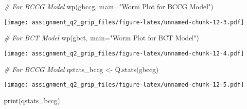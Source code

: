 \documentclass[
]{article}
\newenvironment{Shaded}{\begin{snugshade}}{\end{snugshade}}
\newcommand{\AttributeTok}[1]{\textcolor[rgb]{0.77,0.63,0.00}{#1}}
\newcommand{\CommentTok}[1]{\textcolor[rgb]{0.56,0.35,0.01}{\textit{#1}}}
\newcommand{\FunctionTok}[1]{\textcolor[rgb]{0.00,0.00,0.00}{#1}}
\newcommand{\NormalTok}[1]{#1}
\newcommand{\OtherTok}[1]{\textcolor[rgb]{0.56,0.35,0.01}{#1}}
\newcommand{\StringTok}[1]{\textcolor[rgb]{0.31,0.60,0.02}{#1}}
\begin{document}
\begin{Shaded}
\begin{Highlighting}[]
\CommentTok{\# For BCCG Model}
\FunctionTok{wp}\NormalTok{(gbccg, }\AttributeTok{main=}\StringTok{"Worm Plot for BCCG Model"}\NormalTok{)}
\end{Highlighting}
\end{Shaded}

\texttt{[image: assignment\_q2\_grip\_files/figure-latex/unnamed-chunk-12-3.pdf]}

\begin{Shaded}
\begin{Highlighting}[]
\CommentTok{\# For BCT Model}
\FunctionTok{wp}\NormalTok{(gbct, }\AttributeTok{main=}\StringTok{"Worm Plot for BCT Model"}\NormalTok{)}
\end{Highlighting}
\end{Shaded}

\texttt{[image: assignment\_q2\_grip\_files/figure-latex/unnamed-chunk-12-4.pdf]}

\begin{Shaded}
\begin{Highlighting}[]
\CommentTok{\# For BCCG Model}
\NormalTok{qstats\_bccg }\OtherTok{\textless{}{-}} \FunctionTok{Q.stats}\NormalTok{(gbccg)}
\end{Highlighting}
\end{Shaded}

\texttt{[image: assignment\_q2\_grip\_files/figure-latex/unnamed-chunk-12-5.pdf]}

\begin{Shaded}
\begin{Highlighting}[]
\FunctionTok{print}\NormalTok{(qstats\_bccg)}
\end{Highlighting}
\end{Shaded}
\end{document}
